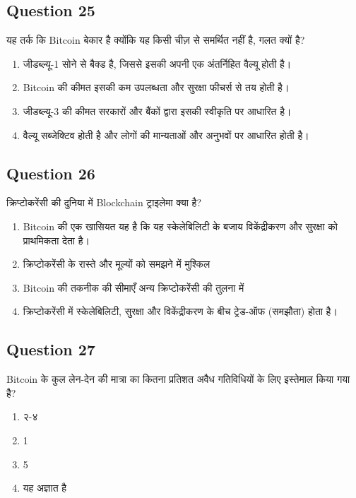 \documentclass[12pt,a4paper]{article}
\begin{document}
\subsection*{Question 25}
यह तर्क कि Bitcoin बेकार है क्योंकि यह किसी चीज़ से समर्थित नहीं है, गलत क्यों है?

\begin{enumerate}[label=\Alph*., leftmargin=*]
\item जीडब्ल्यू-1 सोने से बैक्ड है, जिससे इसकी अपनी एक अंतर्निहित वैल्यू होती है।
\item Bitcoin की कीमत इसकी कम उपलब्धता और सुरक्षा फीचर्स से तय होती है।
\item जीडब्ल्यू-3 की कीमत सरकारों और बैंकों द्वारा इसकी स्वीकृति पर आधारित है।
\item वैल्यू सब्जेक्टिव होती है और लोगों की मान्यताओं और अनुभवों पर आधारित होती है।
\end{enumerate}

\bigskip


\subsection*{Question 26}
क्रिप्टोकरेंसी की दुनिया में Blockchain ट्राइलेमा क्या है?

\begin{enumerate}[label=\Alph*., leftmargin=*]
\item Bitcoin की एक खासियत यह है कि यह स्केलेबिलिटी के बजाय विकेंद्रीकरण और सुरक्षा को प्राथमिकता देता है।
\item क्रिप्टोकरेंसी के रास्ते और मूल्यों को समझने में मुश्किल
\item Bitcoin की तकनीक की सीमाएँ अन्य क्रिप्टोकरेंसी की तुलना में
\item क्रिप्टोकरेंसी में स्केलेबिलिटी, सुरक्षा और विकेंद्रीकरण के बीच ट्रेड-ऑफ (समझौता) होता है।
\end{enumerate}

\bigskip


\subsection*{Question 27}
Bitcoin के कुल लेन-देन की मात्रा का कितना प्रतिशत अवैध गतिविधियों के लिए इस्तेमाल किया गया है?

\begin{enumerate}[label=\Alph*., leftmargin=*]
\item २-४%
\item 1%
\item 5%
\item यह अज्ञात है
\end{enumerate}
\end{document}
